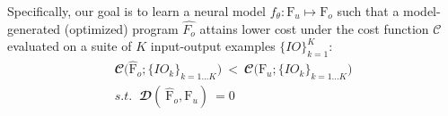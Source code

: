 \documentclass{article}
\begin{document}


Specifically, our goal is to learn a neural model $f_{\theta}: \text{F}_u \mapsto \text{F}_o$ such that a model-generated (optimized) program $\hat{F_o}$ attains lower cost under the cost function $\mathcal{C}$ evaluated on a suite of $K$ input-output examples $\{ IO \}_{k=1}^K$:
\begin{equation}
    \label{eqn:optimizaiton_goal}
    \begin{split}
        \mathbfcal{C} \Big(\hat{\textrm{F}}_{o}; \{IO_k\}_{k=1...K} \Big)  \ 
        < \ 
        \mathbfcal{C} \Big(\textrm{F}_{u}; \{IO_k\}_{k=1...K}\Big) \\
         s.t. \;\; \mathbfcal{D}( \ 
                        \hat{\textrm{F}}_{o}, \textrm{F}_{u} ) \ 
                        = 0  %
    \end{split}
\end{equation}



\end{document}
